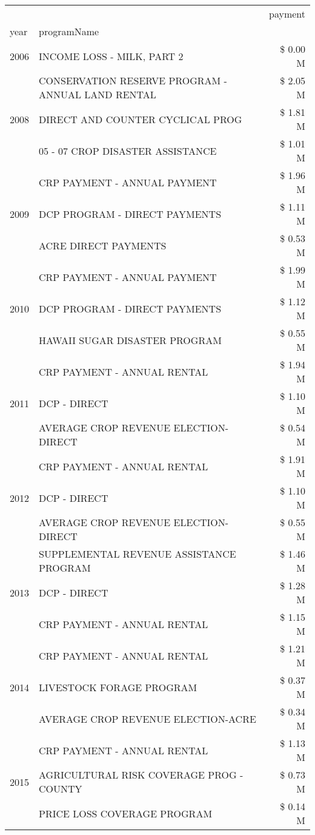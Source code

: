 \begin{tabular}{llr}
\toprule
 &  & payment \\
year & programName &  \\
\midrule
2006 & INCOME LOSS - MILK, PART 2 & \$ 0.00 M \\
\cline{1-3}
\multirow[t]{3}{*}{2008} & CONSERVATION RESERVE PROGRAM - ANNUAL LAND RENTAL & \$ 2.05 M \\
 & DIRECT AND COUNTER CYCLICAL PROG & \$ 1.81 M \\
 & 05 - 07 CROP DISASTER ASSISTANCE & \$ 1.01 M \\
\cline{1-3}
\multirow[t]{3}{*}{2009} & CRP PAYMENT - ANNUAL PAYMENT & \$ 1.96 M \\
 & DCP PROGRAM - DIRECT PAYMENTS & \$ 1.11 M \\
 & ACRE DIRECT PAYMENTS & \$ 0.53 M \\
\cline{1-3}
\multirow[t]{3}{*}{2010} & CRP PAYMENT - ANNUAL PAYMENT & \$ 1.99 M \\
 & DCP PROGRAM - DIRECT PAYMENTS & \$ 1.12 M \\
 & HAWAII SUGAR DISASTER PROGRAM & \$ 0.55 M \\
\cline{1-3}
\multirow[t]{3}{*}{2011} & CRP PAYMENT - ANNUAL RENTAL & \$ 1.94 M \\
 & DCP - DIRECT & \$ 1.10 M \\
 & AVERAGE CROP REVENUE ELECTION-DIRECT & \$ 0.54 M \\
\cline{1-3}
\multirow[t]{3}{*}{2012} & CRP PAYMENT - ANNUAL RENTAL & \$ 1.91 M \\
 & DCP - DIRECT & \$ 1.10 M \\
 & AVERAGE CROP REVENUE ELECTION-DIRECT & \$ 0.55 M \\
\cline{1-3}
\multirow[t]{3}{*}{2013} & SUPPLEMENTAL REVENUE ASSISTANCE PROGRAM & \$ 1.46 M \\
 & DCP - DIRECT & \$ 1.28 M \\
 & CRP PAYMENT - ANNUAL RENTAL & \$ 1.15 M \\
\cline{1-3}
\multirow[t]{3}{*}{2014} & CRP PAYMENT - ANNUAL RENTAL & \$ 1.21 M \\
 & LIVESTOCK FORAGE PROGRAM & \$ 0.37 M \\
 & AVERAGE CROP REVENUE ELECTION-ACRE & \$ 0.34 M \\
\cline{1-3}
\multirow[t]{3}{*}{2015} & CRP PAYMENT - ANNUAL RENTAL & \$ 1.13 M \\
 & AGRICULTURAL RISK COVERAGE PROG - COUNTY & \$ 0.73 M \\
 & PRICE LOSS COVERAGE PROGRAM & \$ 0.14 M \\

\end{tabular}
